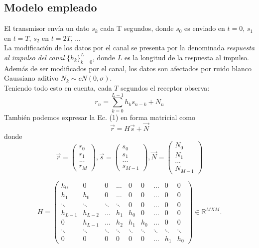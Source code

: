 \documentclass[10pt,journal,compsoc]{IEEEtran}
\begin{document}
\subsection{Modelo empleado}
El transmisor env\'ia un dato ${s_{k}}$ cada T segundos, donde ${s_0}$ es enviado en $t = 0$, ${s_1}$ en $t = T$, ${s_2}$ en $t = 2T$, ...\\
La modificaci\'on de los datos por el canal se presenta por la denominada \textit{respuesta al impulso del canal} $\{{h_{k}\}}_{k=0}^{L}$, donde $L$ es la longitud de la respuesta al impulso. \\
Adem\'as de ser modificados por el canal, los datos son afectados por ruido blanco Gaussiano aditivo ${N_k}\sim cN(0, \sigma)$.\\
Teniendo todo esto en cuenta, cada $T$ segundos el receptor observa: \\
\begin{equation}
r_n = \sum_{k=0}^{L-1} {h_{k}s_{n-k}}+N_n
\end{equation}
Tambi\'en podemos expresar la Ec. (1) en forma matricial como
\begin{equation}
\vec{r} = H\vec{s}+\vec{N}
\end{equation}
donde
\begin{equation}
\vec{r} = \left(
\begin{array}{c}
r_0\\ r_1\\ ...\\r_M
\end{array}
\right)
 , \vec{s}= \left(
\begin{array}{c}
s_0\\ s_1\\ ...\\s_{M-1}
\end{array}
\right)  ,
\vec{N}=\left(
\begin{array}{c}
N_0\\ N_1\\ ...\\N_{M-1}
\end{array}
\right)
\end{equation}

\begin{equation}
H = \left(
\begin{array}{ccccccccc}
h_{0} & 0 & 0 & \ldots & 0 & 0 & \ldots & 0 & 0\\ 
h_1 & h_0 &0&\ldots&0&0&\ldots&0&0 \\
\ddots & \ddots & \ddots & \ddots &0&0& \ldots&0&0\\
h_{L-1} &h_{L-2} &   \ldots & h_{1} & h_{0} &0 & \ldots & 0 & 0\\
0 &h_{L-1} &  \ldots & h_{2} & h_{1} & h_{0} & \ldots & 0 & 0 \\
\ddots&\ddots&\ddots&\ddots&\ddots&\ddots&\ddots&\ddots & \ddots \\ 
0&0&0&0&0&0&\ldots&h_1 & h_0
\end{array}
\right) \in \mathbb{R}^{M X M}.
\end{equation}
\end{document}
